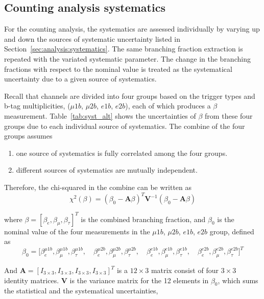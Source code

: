 \FloatBarrier



\subsection{Counting analysis systematics}

For the counting analysis, the systematics are assessed individually by
varying up and down the sources of systematic uncertainty listed in
Section~\ref{sec:analysis:systematics}. The same branching fraction 
extraction is repeated with the variated systematic parameter.
The change in the branching fractions 
with respect to the nominal value is treated as the systematical uncertainty
due to a given source of systematics.

Recall that channels are divided into 
four groups based on the trigger types and b-tag multiplicities,
($\mu1b$, $\mu2b$, $e1b$, $e2b$), each of which produces a $\beta$ measurement. 
Table~\ref{tab:syst_alt} shows the 
uncertainties of $\beta$ from these four groups due to each individual source of systematics.
The combine of the four groups assumes
\begin{enumerate}
    \item one source of systematics is fully correlated among the four groups.
    \item different sources of systematics are mutually independent.
\end{enumerate}

\noindent Therefore, the chi-squared in the combine can be written as
\begin{equation}
    \chi^2 (\beta) = (\beta_0 - \textbf{A} \beta )^T \textbf{V}^{-1} (\beta_0 - \textbf{A} \beta )
\end{equation}

\noindent where $\beta = [\beta_e, \beta_\mu, \beta_\tau]^T $ is the combined branching fraction, and
$\beta_0$ is the nominal value of the four measurements in the $\mu1b$, $\mu2b$, $e1b$, $e2b$ group, defined as
% 
\begin{equation}
    \beta_0 = \bigg [
    \beta_e^{\mu1b}, \beta_\mu^{\mu1b}, \beta_\tau^{\mu1b}, \quad 
    \beta_e^{\mu2b}, \beta_\mu^{\mu2b}, \beta_\tau^{\mu2b}, \quad 
    \beta_e^{e1b}, \beta_\mu^{e1b}, \beta_\tau^{e1b}, \quad
    \beta_e^{e2b}, \beta_\mu^{e2b}, \beta_\tau^{e2b}
    \bigg ]^T
\end{equation}

\noindent And $\textbf{A}=[I_{3\times3}, I_{3\times3}, I_{3\times3}, I_{3\times3}]^T$ is a $12 \times 3$ 
matrix consist of four $3\times 3$ identity matrices. $\textbf{V}$ is the variance matrix for the 12 
elements in $\beta_0$, which sums the statistical and the systematical uncertainties,

